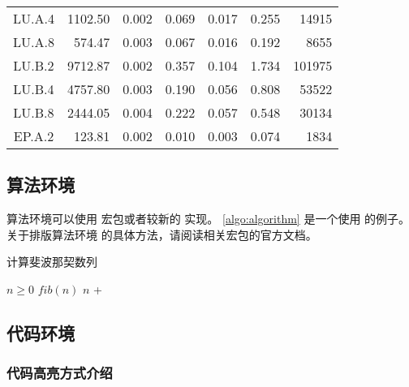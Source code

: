 \begin{ThreePartTable}
\begin{longtable}[c]{c*{6}{r}}
    LU.A.4                 & 1102.50                             & 0.002                               & 0.069          & 0.017 & 0.255 & 14915  \\
    LU.A.8                 & 574.47                              & 0.003                               & 0.067          & 0.016 & 0.192 & 8655   \\
    LU.B.2                 & 9712.87                             & 0.002                               & 0.357          & 0.104 & 1.734 & 101975 \\
    LU.B.4                 & 4757.80                             & 0.003                               & 0.190          & 0.056 & 0.808 & 53522  \\
    LU.B.8                 & 2444.05                             & 0.004                               & 0.222          & 0.057 & 0.548 & 30134  \\
    EP.A.2                 & 123.81                              & 0.002                               & 0.010          & 0.003 & 0.074 & 1834   \\
    \bottomrule
  \end{longtable}
\end{ThreePartTable}



\subsection{算法环境}

算法环境可以使用  宏包或者较新的  实现。
\cref{algo:algorithm} 是一个使用  的例子。关于排版算法环境
的具体方法，请阅读相关宏包的官方文档。

\begin{algorithm}
  \caption{计算斐波那契数列}\label{algo:algorithm}
  \begin{algorithmic}[1]
    \Require $n \geq 0$
    \Ensure $fib(n)$
    \State \Return $n$
    \Else
    \State \Return {} + 
    \EndIf
    \EndFunction
  \end{algorithmic}
\end{algorithm}

\subsection{代码环境}

\subsubsection{代码高亮方式介绍}

